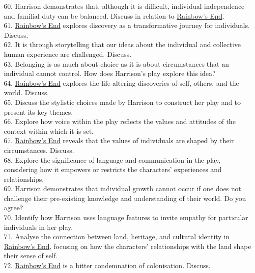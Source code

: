 \documentclass[a4paper]{article}
\begin{document}
60. Harrison demonstrates that, although it is difficult, individual independence and familial duty can be balanced. Discuss in relation to \underline{Rainbow’s End}.\\

61. \underline{Rainbow’s End} explores discovery as a transformative journey for individuals. Discuss.\\

62. It is through storytelling that our ideas about the individual and collective human experience are challenged. Discuss.\\

63. Belonging is as much about choice as it is about circumstances that an individual cannot control. How does Harrison’s play explore this idea?\\

64. \underline{Rainbow’s End} explores the life-altering discoveries of self, others, and the world. Discuss.\\

65. Discuss the stylistic choices made by Harrison to construct her play and to present its key themes.\\

66. Explore how voice within the play reflects the values and attitudes of the context within which it is set.\\

67. \underline{Rainbow’s End} reveals that the values of individuals are shaped by their circumstances. Discuss.\\

68. Explore the significance of language and communication in the play, considering how it empowers or restricts the characters’ experiences and relationships.\\

69. Harrison demonstrates that individual growth cannot occur if one does not challenge their pre-existing knowledge and understanding of their world. Do you agree?\\

70. Identify how Harrison uses language features to invite empathy for particular individuals in her play.\\

71. Analyse the connection between land, heritage, and cultural identity in \underline{Rainbow’s End}, focusing on how the characters’ relationships with the land shape their sense of self.\\

72. \underline{Rainbow’s End} is a bitter condemnation of colonisation. Discuss.\\
\end{document}
